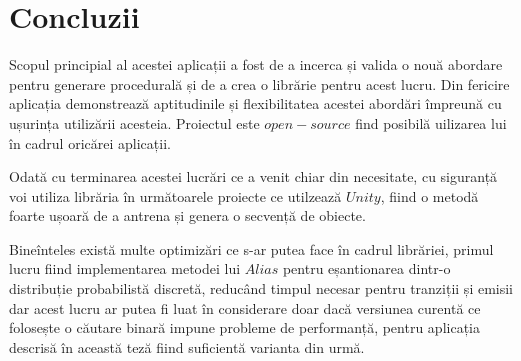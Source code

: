 \chapter*{Concluzii} 


Scopul principial al acestei aplicații a fost de a incerca și valida o nouă abordare pentru generare procedurală și de a crea o librărie pentru acest lucru. Din fericire aplicația demonstrează aptitudinile și flexibilitatea acestei abordări împreună cu ușurința utilizării acesteia. Proiectul este $open-source$ find posibilă uilizarea lui în cadrul oricărei aplicații.\par

Odată cu terminarea acestei lucrări ce a venit chiar din necesitate, cu siguranță voi utiliza librăria în următoarele proiecte ce utilzează $Unity$, fiind o metodă foarte ușoară de a antrena și genera o secvență de obiecte.\par

Bineînteles există multe optimizări ce s-ar putea face în cadrul librăriei, primul lucru fiind implementarea metodei lui $Alias$ pentru eșantionarea dintr-o distribuție probabilistă discretă, reducând timpul necesar pentru tranziții și emisii dar acest lucru ar putea fi luat în considerare doar dacă versiunea curentă ce folosește o căutare binară impune probleme de performanță, pentru aplicația descrisă în această teză fiind suficientă varianta din urmă.\par
